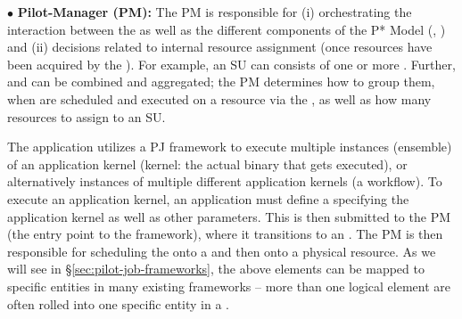 \documentclass[conference]{IEEEtran}
\begin{document}
\noindent$\bullet$ \textbf{Pilot-Manager (PM):} The PM is responsible for (i)
  orchestrating the interaction between the \pilots as well as the
  different components of the P* Model (\cus, \sus) and (ii) decisions
  related to internal resource assignment (once resources have been
  acquired by the \pilotjob).  For example, an SU can consists of one
  or more \cus. Further, \cus and \sus can be combined and aggregated;
  the PM determines how to group them, when \sus are scheduled and
  executed on a resource via the \pilot, as well as how many resources
  to assign to an SU.







  
  The application utilizes a PJ framework to execute multiple
  instances (ensemble) of an application kernel (kernel: 
  the actual binary that gets executed), or
  alternatively instances of multiple different application kernels (a
  workflow).  To execute an application kernel, an application must
  define a \cu specifying the application kernel as well as other
  parameters. This \cu is then submitted to the PM (the entry point to
  the \pilotjob framework), where it transitions to an \su. The PM is
  then responsible for scheduling the \su onto a \pilot and then onto
  a physical resource.  As we will see in
  \S\ref{sec:pilot-job-frameworks}, the above elements can be mapped
  to specific entities in many existing \pilotjob frameworks --
  more than one logical element are often rolled into
  one specific entity in a \pilotjob.

% 
% 
\end{document}
